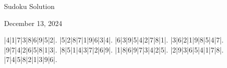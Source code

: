 \documentclass{article}
\begin{document}
\begin{center}
\Huge{Sudoku Solution}
\end{center}
\begin{center}
\Large{December 13, 2024}
\end{center}
\begin{sudoku}
|4|1|7|3|8|6|9|5|2|.
|5|2|8|7|1|9|6|3|4|.
|6|3|9|5|4|2|7|8|1|.
|3|6|2|1|9|8|5|4|7|.
|9|7|4|2|6|5|8|1|3|.
|8|5|1|4|3|7|2|6|9|.
|1|8|6|9|7|3|4|2|5|.
|2|9|3|6|5|4|1|7|8|.
|7|4|5|8|2|1|3|9|6|.
\end{sudoku}
\end{document}

